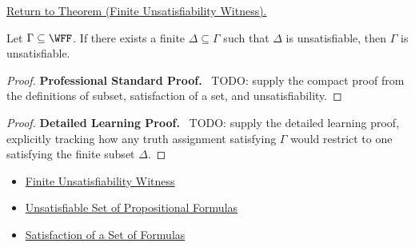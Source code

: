 \newpage
{}
\label{prf:finite-unsatisfiability-witness-propositional-logic}

\begin{remark*}[Return]
\hyperref[thm:finite-unsatisfiability-witness-propositional-logic]{Return to Theorem (Finite Unsatisfiability Witness).}
\end{remark*}

\begin{theorem*}
Let \(\Gamma\subseteq\WFF\). If there exists a finite
\(\Delta\subseteq\Gamma\) such that \(\Delta\) is unsatisfiable, then
\(\Gamma\) is unsatisfiable.
\end{theorem*}

\begin{proof}
\textbf{Professional Standard Proof.}~
TODO: supply the compact proof from the definitions of subset, satisfaction of
a set, and unsatisfiability.
\end{proof}

\begin{proof}
\textbf{Detailed Learning Proof.}~
TODO: supply the detailed learning proof, explicitly tracking how any truth
assignment satisfying \(\Gamma\) would restrict to one satisfying the finite
subset \(\Delta\).
\end{proof}

\begin{remark*}
\end{remark*}

\begin{dependencies}
\begin{itemize}
  \item \hyperref[def:finite-unsatisfiability-witness-propositional-logic]{Finite Unsatisfiability Witness}
  \item \hyperref[def:unsatisfiable-set-of-propositional-formulas]{Unsatisfiable Set of Propositional Formulas}
  \item \hyperref[def:satisfaction-set-propositional-logic]{Satisfaction of a Set of Formulas}
\end{itemize}
\end{dependencies}

\clearpage

